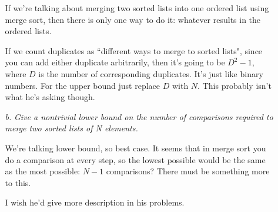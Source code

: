 \documentclass{article}
\begin{document}
\begin{enumerate}
\begin{enumerate}
	If we're talking about merging two sorted lists into one ordered list using
	merge sort, then there is only one way to do it: whatever results in the
	ordered lists.

	If we count duplicates as ``different ways to merge to sorted lists", since
	you can add either duplicate arbitrarily, then it's going to be $D^2-1$,
	where $D$ is the number of corresponding duplicates. It's just like binary
	numbers. For the upper bound just replace $D$ with $N$. This probably isn't
	what he's asking though.

	\item[\textit{b.}]
	\textit{Give a nontrivial lower bound on the number of comparisons required
	to merge two sorted lists of N elements.}

	We're talking lower bound, so best case. It seems that in merge sort you do a
	comparison at every step, so the lowest possible would be the same as the
	most possible: $N-1$ comparisons?  There must be something more to this.

	I wish he'd give more description in his problems.

\end{enumerate}


\end{enumerate}
\end{document}
